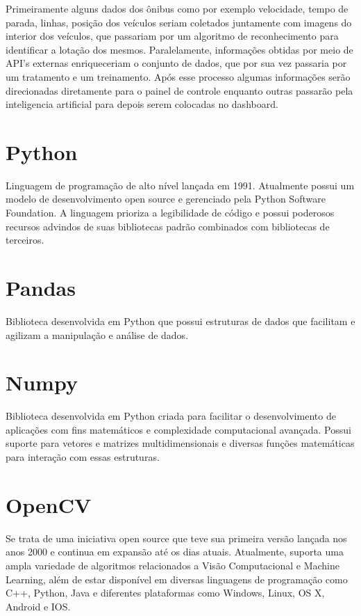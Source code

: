 \indent
\par Primeiramente alguns dados dos ônibus como por exemplo velocidade, tempo de parada, linhas, posição dos veículos seriam coletados juntamente com imagens do interior dos veículos, que passariam por um algoritmo de reconhecimento para identificar a lotação dos mesmos. Paralelamente, informações obtidas por meio de API's externas enriqueceriam o conjunto de dados, que por sua vez passaria por um tratamento e um treinamento. Após esse processo algumas informações serão direcionadas diretamente para o painel de controle enquanto outras passarão pela inteligencia artificial para depois serem colocadas no dashboard.

\section{Python}
\indent
\par Linguagem de programação de alto nível lançada em 1991. Atualmente possui um modelo de desenvolvimento open source e gerenciado pela Python Software Foundation. A linguagem prioriza a legibilidade de código e possui poderosos recursos advindos de suas bibliotecas padrão combinados com bibliotecas de terceiros.

\section{Pandas}
\indent
\par Biblioteca desenvolvida em Python que possui estruturas de dados que facilitam e agilizam a manipulação e análise de dados.

\section{Numpy}
\indent
\par Biblioteca desenvolvida em Python criada para facilitar o desenvolvimento de aplicações com fins matemáticos e complexidade computacional avançada. Possui suporte para vetores e matrizes multidimensionais e diversas funções matemáticas para interação com essas estruturas.

\section{OpenCV}
\indent
\par Se trata de uma iniciativa open source que teve sua primeira versão lançada nos anos 2000 e continua em expansão até os dias atuais. Atualmente, suporta uma ampla variedade de algoritmos relacionados a Visão Computacional e Machine Learning, além de estar disponível em diversas linguagens de programação como C++, Python, Java e diferentes plataformas como Windows, Linux, OS X, Android e IOS.

